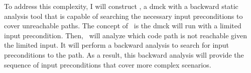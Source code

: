 \documentclass[11pt]{article}
\begin{document}
To address this complexity, I will construct \deepcheck, a dmck with a backward
static analysis tool that is capable of searching the necessary input
preconditions to cover unreachable paths. The concept of \deepcheck\ is the dmck
will run with a limited input precondition. Then, \deepcheck\ will analyze which
code path is not reachable given the limited input. It will perform a backward
analysis to search for input preconditions to the path. As a result, this
backward analysis will provide the sequence of input preconditions that cover
more complex scenarios.
\end{document}

